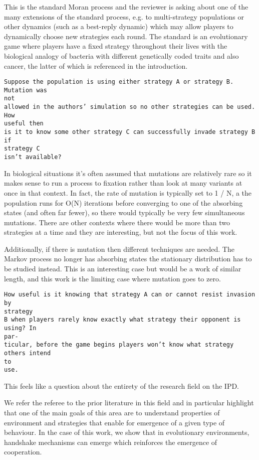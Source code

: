\documentclass[a4]{article}
\begin{document}
This is the standard Moran process and the reviewer is asking about one of
the many extensions of the standard process, e.g. to multi-strategy populations
or other dynamics (such as a best-reply dynamic) which may allow players to
dynamically choose new strategies each round. The standard is an evolutionary
game where players have a fixed strategy throughout their lives with the
biological analogy of bacteria with different genetically coded traits and also
cancer, the latter of which is referenced in the introduction.

\begin{verbatim}
Suppose the population is using either strategy A or strategy B. Mutation was
not
allowed in the authors’ simulation so no other strategies can be used. How
useful then
is it to know some other strategy C can successfully invade strategy B if
strategy C
isn’t available?
\end{verbatim}

In biological situations it's often assumed that mutations are relatively rare
so it makes sense to run a process to fixation rather than look at many
variants at once in that context. In fact, the rate of mutation is typically
set to 1 / N, a the population runs for O(N) iterations before converging to
one of the absorbing states (and often far fewer), so there would typically be
very few simultaneous mutations. There are other contexts where there would be
more than two strategies at a time and they are interesting, but not the focus
of this work.

Additionally, if there is mutation then different techniques are needed. The
Markov process no longer has absorbing states the stationary distribution has 
to be studied instead. This is an interesting case but would be a
work of similar length, and this work is the limiting case where mutation goes
to zero.

\begin{verbatim}
How useful is it knowing that strategy A can or cannot resist invasion by
strategy
B when players rarely know exactly what strategy their opponent is using? In
par-
ticular, before the game begins players won’t know what strategy others intend
to
use.
\end{verbatim}

This feels like a question about the entirety of the research field on the IPD.

We refer the referee to the prior literature in this field and in
particular highlight that one of the main goals of this area are to understand
properties of environment and strategies that enable for emergence of a given
type of behaviour. In the case of this work, we show that in evolutionary
environments, handshake mechanisms can emerge which reinforces the emergence
of cooperation.
\end{document}
